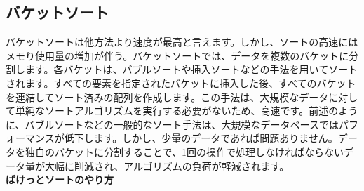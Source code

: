 \documentclass[a4j]{jarticle}
\begin{document}
\subsection{バケットソート}
バケットソートは他方法より速度が最高と言えます。しかし、ソートの高速にはメモり使用量の増加が伴う。バケットソートでは、データを複数のバケットに分割します。各バケットは、バブルソートや挿入ソートなどの手法を用いてソートされます。すべての要素を指定されたバケットに挿入した後、すべてのバケットを連結してソート済みの配列を作成します。この手法は、大規模なデータに対して単純なソートアルゴリズムを実行する必要がないため、高速です。前述のように、バブルソートなどの一般的なソート手法は、大規模なデータベースではパフォーマンスが低下します。しかし、少量のデータであれば問題ありません。データを独自のバケットに分割することで、1回の操作で処理しなければならないデータ量が大幅に削減され、アルゴリズムの負荷が軽減されます。\\
\newpage
\textbf{ばけっとソートのやり方}
\end{document}
